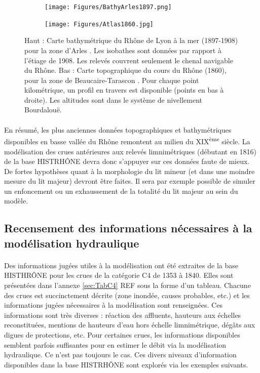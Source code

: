 \documentclass[11pt]{article}
\begin{document}
	\begin{figure}[h]
		\centering
		\begin{subfigure}{.7\linewidth}
			\texttt{[image: Figures/BathyArles1897.png]}
		\end{subfigure}
		
		\vspace{10pt}
		
		\begin{subfigure}{0.7\linewidth}
			\texttt{[image: Figures/Atlas1860.jpg]}
		\end{subfigure}
		\caption{Haut : Carte bathymétrique du Rhône de Lyon à la mer (1897-1908) pour la zone d'Arles \citep{cnr_cartes_1908}. Les isobathes sont données par rapport à l'étiage de 1908. Les relevés couvrent seulement le chenal navigable du Rhône. Bas : Carte topographique du cours du Rhône (1860), pour la zone de Beaucaire-Tarascon \citep{cnr_carte_1876}. Pour chaque point kilométrique, un profil en travers est disponible (points en bas à droite). Les altitudes sont dans le système de nivellement Bourdalouë.}
		\label{fig:BathyTopo}
	\end{figure}
	
	\paragraph{} En résumé, les plus anciennes données topographiques et bathymétriques disponibles en basse vallée du Rhône remontent au milieu du XIX\textsuperscript{ème} siècle. La modélisation des crues antérieures aux relevés limnimétriques (débutant en 1816) de la base HISTRHÔNE devra donc s'appuyer sur ces données faute de mieux. De fortes hypothèses quant à la morphologie du lit mineur (et dans une moindre mesure du lit majeur) devront être faites. Il sera par exemple possible de simuler un enfoncement ou un exhaussement de la totalité du lit majeur au sein du modèle. 
	
\FloatBarrier	
	
	\subsection{Recensement des informations nécessaires à la modélisation hydraulique} 
	
	\paragraph{} Des informations jugées utiles à la modélisation ont été extraites de la base HISTHRÔNE pour les crues de la catégorie C4 de 1353 à 1840. Elles sont présentées dans l'annexe \ref{sec:TabC4} REF sous la forme d'un tableau. Chacune des crues est succinctement décrite (zone inondée, causes probables, etc.) et les informations jugées nécessaires à la modélisation sont renseignées. Ces informations sont très diverses : réaction des affluents, hauteurs aux échelles reconstituées, mentions de hauteurs d'eau hors échelle limnimétrique, dégâts aux digues de protections, etc. Pour certaines crues, les informations disponibles semblent parfois suffisantes pour en estimer le débit via la modélisation hydraulique. Ce n'est pas toujours le cas. Ces divers niveaux d'information disponibles dans la base HISTRHÔNE sont explorés via les exemples suivants. 
	
\end{document}
